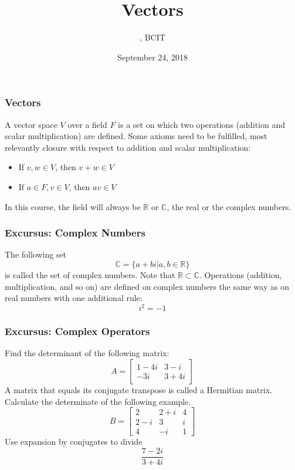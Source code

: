 \documentclass[xcolor=dvipsnames]{beamer}
\title{Vectors}
\subtitle{{\CourseNumber}, BCIT}
\author{\CourseName}
\date{September 24, 2018}
\begin{document}
\begin{frame}
  \titlepage
\end{frame}

\begin{frame}
  \frametitle{Vectors}
  A vector space $V$ over a field $F$ is a set on which two operations
  (addition and scalar multiplication) are defined. Some axioms need
  to be fulfilled, most relevantly \alert{closure} with respect to
  addition and scalar multiplication:
  \begin{itemize}
  \item If $v,w\in{}V$, then $v+w\in{}V$
  \item If $a\in{}F,v\in{}V$, then $av\in{}V$
  \end{itemize}
  In this course, the field will always be $\mathbb{R}$ or
  $\mathbb{C}$, the real or the complex numbers.
\end{frame}

\begin{frame}
  \frametitle{Excursus: Complex Numbers}
  The following set
  \begin{equation}
    \label{eq:oiphaebo}
    \mathbb{C}=\{a+bi|a,b\in\mathbb{R}\}
  \end{equation}
  is called the set of complex numbers. Note that
  $\mathbb{R}\subset\mathbb{C}$. Operations (addition, multiplication,
  and so on) are defined on complex numbers the same way as on real
  numbers with one additional rule:
  \begin{equation}
    \label{eq:thaikiec}
    i^{2}=-1
  \end{equation}
\end{frame}

\begin{frame}
  \frametitle{Excursus: Complex Operators}
  {\ubung} Find the determinant of the following matrix:
  \begin{equation}
    \label{eq:ohhohhoo}
    A=\left[
      \begin{array}{cc}
        1-4i & 3-i \\
        -3i & 3+4i
      \end{array}\right]
  \end{equation}
{\ubung} A matrix that equals its conjugate transpose is called a
\alert{Hermitian matrix}. Calculate the determinate of the following
example.
\begin{equation}
  \label{eq:ohsaiphi}
  B=\left[
    \begin{array}{ccc}
      2 & 2+i & 4 \\
      2-i & 3 & i \\
      4 & -i & 1
    \end{array}\right]
\end{equation}
{\ubung} Use expansion by conjugates to divide
\begin{equation}
  \label{eq:choomeux}
  \frac{7-2i}{3+4i}
\end{equation}
\end{frame}
\end{document}
